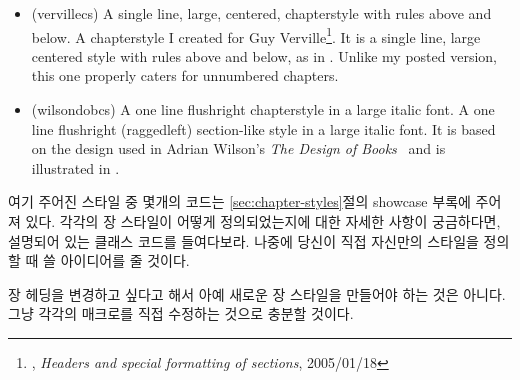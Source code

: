 \begin{itemize}



\item[\cstyle{verville}]
\glossary(vervillecs)%
  {}%
  {A single line, large, centered, chapterstyle with rules above and below.}
 A chapterstyle I created for 
  Guy Verville\footnote{\ctt,
  \textit{Headers and special formatting of sections}, 2005/01/18}. 
  It is a single line, large centered style with rules above 
  and below, as in . Unlike my posted version, 
  this one properly caters for unnumbered chapters.


\item[\cstyle{wilsondob}] 
\glossary(wilsondobcs)%
  {}%
  {A one line flushright chapterstyle in a large italic font.}
A one line flushright (raggedleft) section-like style in a large italic font. 
It is based on the design used in
Adrian Wilson's \textit{The Design of Books}~\cite{ADRIANWILSON93} and 
is illustrated in 
.


\end{itemize}

여기 주어진 스타일 중 몇개의 코드는 \ref{sec:chapter-styles}절의
showcase 부록에 주어져 있다.
각각의 장 스타일이 어떻게 정의되었는지에 대한 자세한 사항이 궁금하다면,
설명되어 있는 클래스 코드를 들여다보라.
나중에 당신이 직접 자신만의 스타일을 정의할 때 쓸 아이디어를 줄 것이다.

장 헤딩을 변경하고 싶다고 해서 아예 새로운 장 스타일을 만들어야 하는 것은 아니다.
그냥 각각의 매크로를 직접 수정하는 것으로 충분할 것이다.


